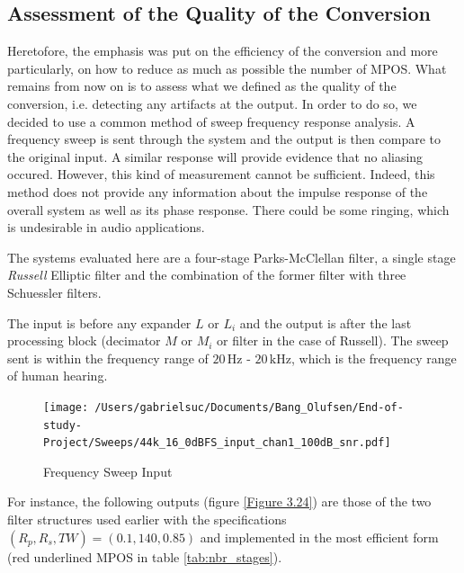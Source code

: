 \subsection{Assessment of the Quality of the Conversion}

Heretofore, the emphasis was put on the efficiency of the conversion and more particularly, on how to reduce as much as possible the number of MPOS. What remains from now on is to assess what we defined as the quality of the conversion, i.e. detecting any artifacts at the output. In order to do so, we decided to use a common method of sweep frequency response analysis. A frequency sweep is sent through the system and the output is then compare to the original input. A similar response will provide evidence that no aliasing occured. However, this kind of measurement cannot be sufficient. Indeed, this method does not provide any information about the impulse response of the overall system as well as its phase response. There could be some ringing, which is undesirable in audio applications. 


 The systems evaluated here are a four-stage Parks-McClellan filter, a single stage \textit{Russell} Elliptic filter and the combination of the former filter with three Schuessler filters. 

The input is before any expander $L$ or $L_i$ and the output is after the last processing block (decimator $M$ or $M_i$ or filter in the case of Russell). The sweep sent is within the frequency range of $20 \, \text{Hz - } 20 \, \text{kHz}$, which is the frequency range of human hearing. \\


\begin{figure}[ht]
	\centering
	\texttt{[image: /Users/gabrielsuc/Documents/Bang\_Olufsen/End-of-study-Project/Sweeps/44k\_16\_0dBFS\_input\_chan1\_100dB\_snr.pdf]}
	\caption{Frequency Sweep Input}\label{Figure 3.23}
\end{figure}

For instance, the following outputs (figure \ref{Figure 3.24}) are those of the two filter structures used earlier with the specifications $(R_p, R_s, TW) = (0.1, 140, 0.85)$ and implemented in the most efficient form (red underlined MPOS in table \ref{tab:nbr_stages}).

